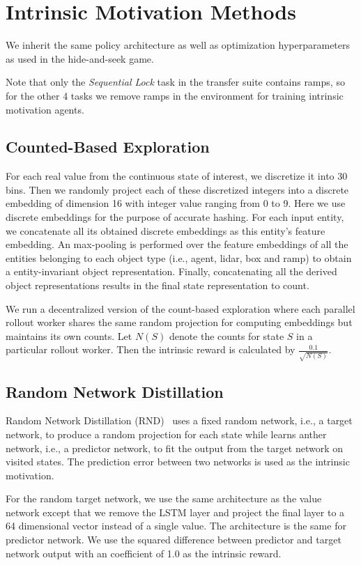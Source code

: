 \section{Intrinsic Motivation Methods}
\label{appendix:intrinsic_motivation}

We inherit the same policy architecture as well as optimization hyperparameters as used in the hide-and-seek game.

Note that only the \emph{Sequential Lock} task in the transfer suite contains ramps, so for the other 4 tasks we remove ramps in the environment for training intrinsic motivation agents. 

\subsection{Counted-Based Exploration }
For each real value from the continuous state of interest, we discretize it into 30 bins. Then we randomly project each of these discretized integers into a discrete embedding of dimension 16 with integer value ranging from 0 to 9. Here we use discrete embeddings for the purpose of accurate hashing. For each input entity, we concatenate all its obtained discrete embeddings as this entity's  feature embedding. An max-pooling is performed over the feature embeddings of all the entities belonging to each object type (i.e., agent, lidar, box and ramp) to obtain a entity-invariant  object representation. Finally, concatenating all the derived object representations results in the final state representation to count.

We run a decentralized version of the count-based exploration where each parallel rollout worker shares the same random projection for computing embeddings but maintains its own counts. Let $N(S)$ denote the counts for state $S$ in a particular rollout worker. Then the intrinsic reward is calculated by $\frac{0.1}{\sqrt{N(S)}}$.

\subsection{Random Network Distillation}
Random Network Distillation (RND)~\citep{burda2018exploration} uses a fixed random network, i.e., a target network, to produce a random projection for each state while learns anther network, i.e., a predictor network, to fit the output from the target network on visited states. The prediction error between two networks is used as the intrinsic motivation.

For the random target network, we use the same architecture as the value network except that we remove the LSTM layer and project the final layer to a 64 dimensional vector instead of a single value.
The architecture is the same for predictor network. We use the squared difference between predictor and target network output with an coefficient of 1.0 as the intrinsic reward.


